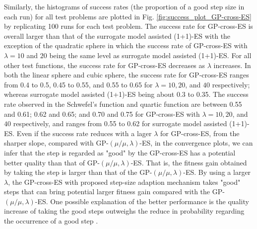 



Similarly, the histograms of success rates (the proportion of a good step size in each run) for all test problems are plotted in Fig. \ref{fig:success_plot_GP-cross-ES} by replicating 100 runs for each test problem. The success rate for GP-cross-ES is overall larger than that of the surrogate model assisted (1+1)-ES with the exception of the quadratic sphere in which the success rate of GP-cross-ES with $\lambda=10$ and $20$ being the same level as surrogate model assisted (1+1)-ES. For all other test functions, the success rate for GP-cross-ES decreases as $\lambda$ increases. In both the linear sphere and cubic sphere, the success rate for GP-cross-ES ranges from 0.4 to 0.5, 0.45 to 0.55, and 0.55 to 0.65 for $\lambda=10,20$, and $40$ respectively; whereas surrogate model assisted (1+1)-ES being about 0.3 to 0.35. The success rate observed in the Schwefel's function and quartic function are between 0.55 and 0.61; 0.62 and 0.65; and 0.70 and 0.75 for GP-cross-ES with $\lambda=10,20$, and $40$ respectively, and ranges from 0.55 to 0.62 for surrogate model assisted (1+1)-ES. Even if the success rate reduces with a lager $\lambda$ for GP-cross-ES, from the sharper slope, compared with GP-$(\mu/\mu,\lambda)$-ES, in the convergence plots, we can infer that the step is regarded as "good" by the GP-cross-ES has a potential better quality than that of GP-$(\mu/\mu,\lambda)$-ES. That is, the fitness gain obtained by taking the step is larger than that of the GP-$(\mu/\mu,\lambda)$-ES. By using a larger $\lambda$, the GP-cross-ES with proposed step-size adaption mechanism takes "good" steps that can bring potential larger fitness gain compared with the GP-$(\mu/\mu,\lambda)$-ES. One possible explanation of the better performance is the quality increase of taking the good steps outweighs the reduce in probability regarding the occurrence of a good step .  



